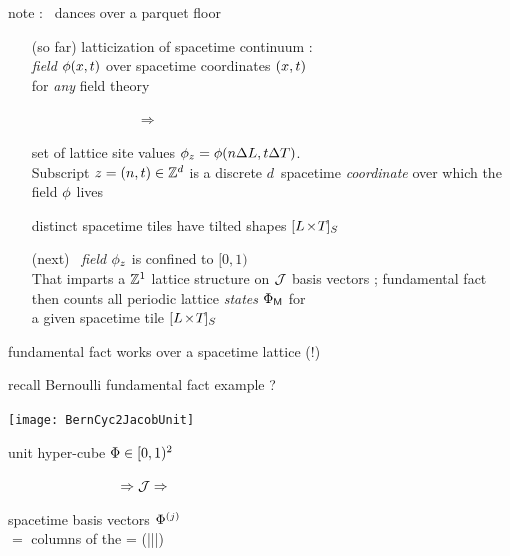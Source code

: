 \begin{frame}{note : \catlatt\ dances over a parquet floor}
\begin{itemize}
  \item[(so far)]
latticization of spacetime continuum :\\
{\color{blue}\emph{field}} $\ssp(x,\zeit)$ over spacetime coordinates
$(x,\zeit)$\\ for {\color{blue}\emph{any}} field theory

~~~~~~~~~~~~~~~$\Rightarrow$

set of lattice site values $\ssp_z=\ssp(n\Delta{L},\zeit\Delta{T})$.\\
Subscript $z=(n,\zeit)\in\integers^d$ is a discrete $d$\dmn\
spacetime {\color{blue}\emph{coordinate}} over which the field $\ssp$ lives
\medskip

distinct spacetime tiles have tilted shapes
$\LTS{}{}{}$
\bigskip

  \item[(next)]
\catlatt\ {\color{blue}\emph{field}} $\ssp_{z}$ is confined to $[0,1)$\\
That imparts a $\integers^1$ lattice structure on {\fundPip} $\jMorb$
basis vectors ; fundamental fact then counts all periodic
{\color{blue}lattice \emph{states}} $\Xx_\Mm$ for \\
a given spacetime tile
$\LTS{}{}{}$
\end{itemize}
\end{frame}


\begin{frame}{fundamental fact works over a spacetime lattice (!)}

    \begin{block}{recall Bernoulli fundamental fact example ?}
\begin{center}
            \begin{minipage}[c]{0.32\textwidth}\begin{center}
\texttt{[image: BernCyc2JacobUnit]}
            \end{center}\end{minipage}
            \hspace{2ex}
            \begin{minipage}[c]{0.46\textwidth}
unit hyper-cube $\Xx\in[0,1)^2$
\medskip

~~~~~~~~~~~~~~~~$\Rightarrow\jMorb\Rightarrow$
\medskip

{\fundPip}
            \end{minipage}
\end{center}
    \end{block}

\vfill

spacetime {\fundPip} basis
vectors $\jEigvec[j]$ \\
$=$ columns of the {\color{blue}\jacobianOrb}
\beq
\jMorb = (\jEigvec[1]|\jEigvec[2]|\cdots|\jEigvec[\speriod{}\period{}])
\ee{lattJac}
\end{frame}


